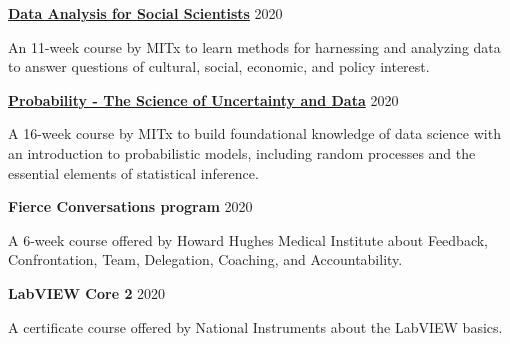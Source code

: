 \documentclass[margin,line]{res}
\begin{document}
\begin{resume}
{\bf \href{https://mitxonline.mit.edu/courses/course-v1:MITxT+14.310x/}{Data Analysis for Social Scientists}} \hfill {2020}\\
\vspace*{-3.5mm}
\begin{addmargin}[0pt]{.1\linewidth}
\vspace*{-1mm}
An 11-week course by MITx to learn methods for harnessing and analyzing data to answer questions of cultural, social, economic, and policy interest.
\end{addmargin}

\vspace*{-2mm}

{\bf \href{https://www.edx.org/course/probability-the-science-of-uncertainty-and-data}{Probability - The Science of Uncertainty and Data}} \hfill {2020}\\
\vspace*{-3.5mm}
\begin{addmargin}[0pt]{.1\linewidth}
\vspace*{-1mm}
A 16-week course by MITx to build foundational knowledge of data science with an introduction to probabilistic models, including random processes and the essential elements of statistical inference.
\end{addmargin}

\vspace*{-2mm}

{\bf Fierce Conversations program} \hfill {2020}\\
\vspace*{-3.5mm}
\begin{addmargin}[0pt]{.1\linewidth}
\vspace*{-1mm}
A 6-week course offered by Howard Hughes Medical Institute about Feedback, Confrontation, Team, Delegation, Coaching, and Accountability.
\end{addmargin}

\vspace*{-2mm}

{\bf LabVIEW Core 2} \hfill {2020}\\
\vspace*{-3.5mm}
\begin{addmargin}[0pt]{.1\linewidth}
\vspace*{-1mm}
A certificate course offered by National Instruments about the LabVIEW basics.
\end{addmargin}

\vspace*{-2mm}


\end{resume}
\end{document}
